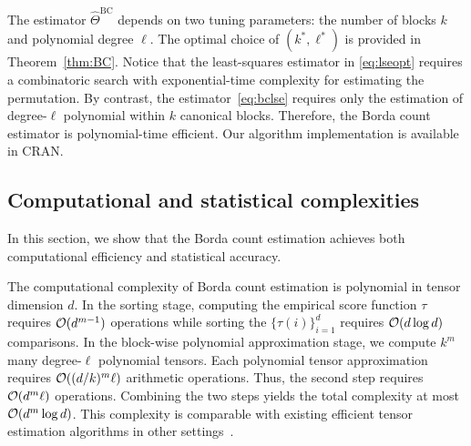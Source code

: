 \documentclass[11pt]{article}
\theoremstyle{definition}
\begin{document}
The estimator $\hat\Theta^{\text{BC}}$ depends on two tuning parameters: the number of blocks $k$ and polynomial degree $\ell$. The optimal choice of $(k^*,\ell^*)$ is provided in Theorem~\ref{thm:BC}.
 Notice that the least-squares estimator in \eqref{eq:lseopt} requires a combinatoric search with exponential-time complexity for estimating the permutation. By contrast, the estimator~\eqref{eq:bclse} requires only the estimation of degree-$\ell$ polynomial within $k$ canonical blocks. Therefore, the Borda count estimator is polynomial-time efficient. Our algorithm implementation is available in CRAN. 



\subsection{Computational and statistical complexities}
In this section, we show that the Borda count estimation achieves both computational efficiency and statistical accuracy. 

The computational complexity of Borda count estimation is polynomial in tensor dimension $d$. In the sorting stage, computing the empirical score function $\tau$ requires $\mathcal{O}(d^{m-1})$ operations while sorting the $\{\tau(i)\}_{i=1}^d$ requires $\mathcal{O}(d\log d)$ comparisons. In the block-wise polynomial approximation stage, we compute $k^m$ many degree-$\ell$ polynomial tensors. Each polynomial tensor approximation requires $\mathcal{O}((d/k)^m\ell)$ arithmetic operations. Thus, the second step requires $\mathcal{O}(d^m\ell)$ operations. Combining the two steps yields the total complexity at most $\mathcal{O}(d^m\log d)$. This complexity is comparable with existing efficient tensor estimation algorithms in other settings~\citep{li2019nearest,zhang2018tensor}.
\end{document}
